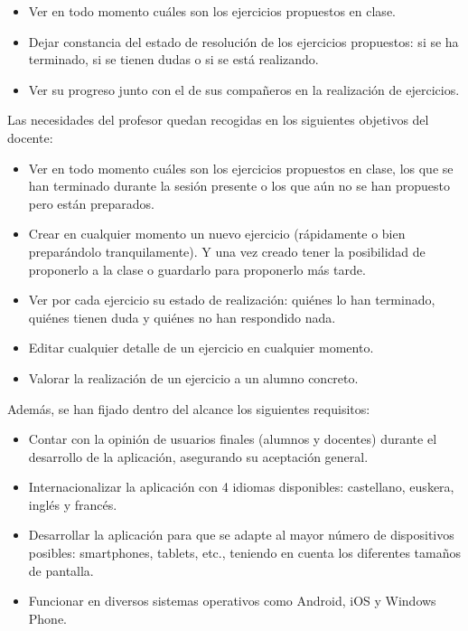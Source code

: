 \begin{itemize}
\item Ver en todo momento cuáles son los ejercicios propuestos en clase.
\item Dejar constancia del estado de resolución de los ejercicios propuestos: si se ha terminado, si se tienen dudas o si se está realizando.
\item Ver su progreso junto con el de sus compañeros en la realización de ejercicios.
\end{itemize}

Las necesidades del profesor quedan recogidas en los siguientes objetivos del docente:

\begin{itemize}
\item Ver en todo momento cuáles son los ejercicios propuestos en clase, los que se han terminado durante la sesión presente o los que aún no se han propuesto pero están preparados.
\item Crear en cualquier momento un nuevo ejercicio (rápidamente o bien preparándolo tranquilamente). Y una vez creado tener la posibilidad de proponerlo a la clase o guardarlo para proponerlo más tarde.
\item Ver por cada ejercicio su estado de realización: quiénes lo han terminado, quiénes tienen duda y quiénes no han respondido nada.
\item Editar cualquier detalle de un ejercicio en cualquier momento.
\item Valorar la realización de un ejercicio a un alumno concreto.
\end{itemize}

Además, se han fijado dentro del alcance los siguientes requisitos:

\begin{itemize}
\item Contar con la opinión de usuarios finales (alumnos y docentes) durante el desarrollo de la aplicación, asegurando su aceptación general.
\item Internacionalizar la aplicación con 4 idiomas disponibles: castellano, euskera, inglés y francés.
\item Desarrollar la aplicación para que se adapte al mayor número de dispositivos posibles: smartphones, tablets, etc., teniendo en cuenta los diferentes tamaños de pantalla.
\item Funcionar en diversos sistemas operativos como Android, iOS y Windows Phone.
\end{itemize}


